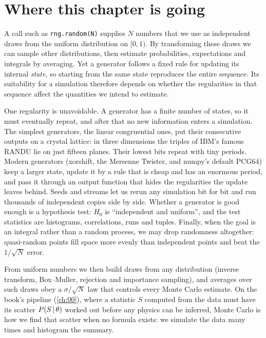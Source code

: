\section*{Where this chapter is going}
\label{6a:sec:roadmap}

A call such as \texttt{rng.random(N)} supplies $N$ numbers that we use as
independent draws from the uniform distribution on $[0,1)$. By transforming
these draws we can sample other distributions, then estimate probabilities,
expectations and integrals by averaging. Yet a generator follows a fixed rule
for updating its internal \emph{state}, so starting from the same state
reproduces the entire sequence. Its suitability for a simulation therefore
depends on whether the regularities in that sequence affect the quantities
we intend to estimate.

One regularity is unavoidable. A generator has a
finite number of states, so it must eventually repeat, and after that no new
information enters a simulation. The simplest generators, the linear
congruential ones, put their consecutive outputs on a crystal lattice: in three
dimensions the triples of IBM's famous RANDU lie on just fifteen planes. Their
lowest bits repeat with tiny periods. Modern generators (xorshift, the Mersenne
Twister, and numpy's default PCG64) keep a larger state, update it by a rule that
is cheap and has an enormous period, and pass it through an output function that
hides the regularities the update leaves behind. Seeds and streams let us rerun
any simulation bit for bit and run thousands of independent copies side by side.
Whether a generator is good enough is a hypothesis test: $H_0$ is ``independent
and uniform'', and the test statistics are histograms, correlations, runs and
tuples. Finally, when the goal is an integral rather than a random process, we
may drop randomness altogether: quasi-random points fill space more evenly than
independent points and beat the $1/\sqrt N$ error.

From uniform numbers we then build draws from any distribution (inverse
transform, Box--Muller, rejection and importance sampling), and averages over
such draws obey a $\sigma/\sqrt N$ law that controls every Monte Carlo estimate.
On the book's pipeline (\cref{ch:00}), where a statistic $S$ computed from the
data must have its scatter $P(S\,\vert\,\theta)$ worked out before any physics can
be inferred, Monte Carlo is how we find that scatter when no formula exists: we simulate the data
many times and histogram the summary.

